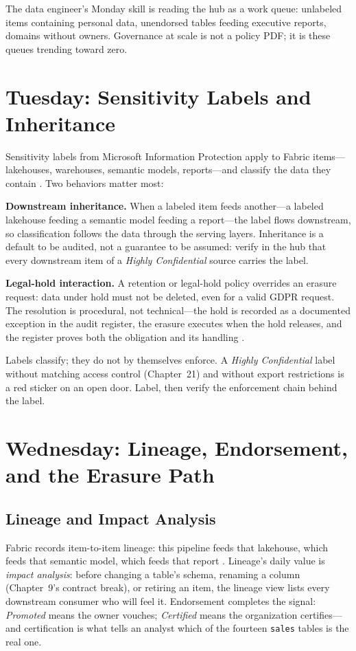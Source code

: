 The data engineer's Monday skill is reading the hub as a work queue: unlabeled items containing personal data, unendorsed tables feeding executive reports, domains without owners. Governance at scale is not a policy PDF; it is these queues trending toward zero.

\section{Tuesday: Sensitivity Labels and Inheritance}
Sensitivity labels from Microsoft Information Protection apply to Fabric items---lakehouses, warehouses, semantic models, reports---and classify the data they contain \cite{microsoftPurviewFabric}. Two behaviors matter most:

\textbf{Downstream inheritance.} When a labeled item feeds another---a labeled lakehouse feeding a semantic model feeding a report---the label flows downstream, so classification follows the data through the serving layers. Inheritance is a default to be audited, not a guarantee to be assumed: verify in the hub that every downstream item of a \emph{Highly Confidential} source carries the label.

\textbf{Legal-hold interaction.} A retention or legal-hold policy overrides an erasure request: data under hold must not be deleted, even for a valid GDPR request. The resolution is procedural, not technical---the hold is recorded as a documented exception in the audit register, the erasure executes when the hold releases, and the register proves both the obligation and its handling \cite{microsoftPurviewFabric}.

\begin{pitfall}
Labels classify; they do not by themselves enforce. A \emph{Highly Confidential} label without matching access control (Chapter~21) and without export restrictions is a red sticker on an open door. Label, then verify the enforcement chain behind the label.
\end{pitfall}

\section{Wednesday: Lineage, Endorsement, and the Erasure Path}
\subsection{Lineage and Impact Analysis}
Fabric records item-to-item lineage: this pipeline feeds that lakehouse, which feeds that semantic model, which feeds that report \cite{microsoftFabricLineage}. Lineage's daily value is \emph{impact analysis}: before changing a table's schema, renaming a column (Chapter~9's contract break), or retiring an item, the lineage view lists every downstream consumer who will feel it. Endorsement completes the signal: \emph{Promoted} means the owner vouches; \emph{Certified} means the organization certifies---and certification is what tells an analyst which of the fourteen \texttt{sales} tables is the real one.

